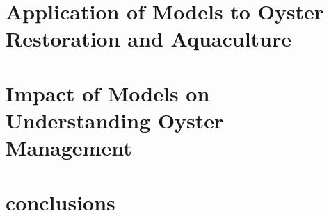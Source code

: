 \documentclass{article}
\begin{document}
\section*{Application of Models to Oyster Restoration and Aquaculture}
\label{sec:aquaculture_restoration_summary}

\section*{Impact of Models on Understanding Oyster Management}
\label{sec:impact_of_models}

\section*{conclusions}
\label{sec:conclusions}



\end{document}
